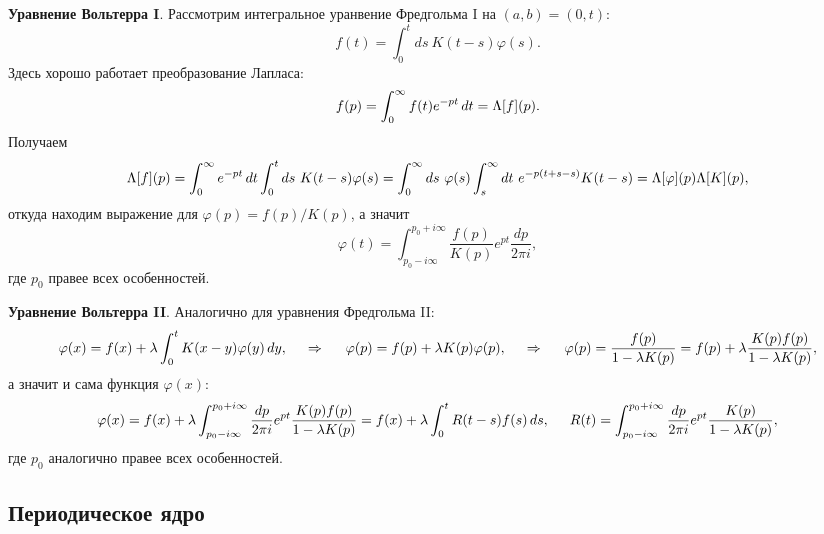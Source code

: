\textbf{Уравнение Вольтерра I}. Рассмотрим интегральное уранвение Фредгольма I на $(a,b) = (0, t)$:
\begin{equation*}
	f(t) = \int_{0}^{t} ds\ K(t-s) \varphi(s).
\end{equation*}
Здесь хорошо работает преобразование Лапласа:
\begin{equation*}
	f(p) = \int_{0}^{\infty}  f(t) e^{-pt} \, d t = \Lambda[f](p).
\end{equation*}
Получаем
\begin{equation*}
	\Lambda[f](p) = \int_{0}^{\infty} e^{-pt} \, d t \int_{0}^{t} ds\ K(t-s) \varphi(s) = \int_{0}^{\infty} ds\ \varphi(s) \int_{s}^{\infty} dt\ e^{-p(t+s-s)} K(t-s) = \Lambda[\varphi](p) \Lambda[K](p),
\end{equation*}
откуда находим выражение для $\varphi(p) = f(p) / K(p)$, а значит
\begin{equation}
	\varphi(t)  = \int_{p_0 - i \infty}^{p_0 + i \infty} \frac{f(p)}{K(p)} e^{pt} \frac{dp}{2\pi i},
\end{equation}
где $p_0$ правее всех особенностей.

\textbf{Уравнение Вольтерра II}.
Аналогично для уравнения Фредгольма II:
\begin{equation*}
	\varphi(x) = f(x) + \lambda \int_{0}^{t} K(x-y) \varphi(y) \, d y,
	\hspace{0.5cm} \Rightarrow \hspace{0.5cm}
	\varphi(p) = f(p) + \lambda K(p) \varphi(p),
	\hspace{0.5cm} \Rightarrow \hspace{0.5cm}
	\varphi(p) = \frac{f(p)}{1 - \lambda K(p)} = f(p) + \lambda \frac{K(p) f(p)}{1-\lambda K(p)},
\end{equation*}
а значит и сама функция $\varphi(x)$:
\begin{equation*}
	\varphi(x) = f(x) + \lambda \int_{p_0 - i \infty}^{p_0 + i \infty} \frac{dp}{2\pi i} e^{pt} \frac{K(p) f(p)}{1-\lambda K(p)} = f(x) + \lambda \int_{0}^{t} R(t-s) f(s) \, d s,
	\hspace{5 mm} 
	R(t) = \int_{p_0 - i \infty}^{p_0 + i \infty} \frac{dp}{2\pi i} e^{pt} \frac{K(p)}{1-\lambda K(p)},
\end{equation*}
где $p_0$ аналогично правее всех особенностей. 

\subsection*{Периодическое ядро}


